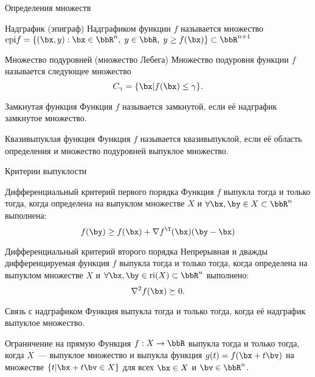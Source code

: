 \documentclass[12pt,russian]{beamer}
\begin{document}
\begin{frame}{Определения множеств}
\footnotesize
\begin{block}{Надграфик (эпиграф)}
Надграфиком функции $f$ называется множество $\text{epi}f = \{ (\bx, y) : \bx \in \bbR^n, \; y \in \bbR, \; y \geq f(\bx) \} \subset \bbR^{n+1}$
\end{block}

\begin{block}{Множество подуровней (множество Лебега)}
Множество подуровня функции $f$ называется следующее множество
\vspace{-4mm}
\[
C_{\gamma} = \{ \bx | f(\bx) \leq \gamma \}.
\]
\end{block}

\begin{block}{Замкнутая функция}
Функция $f$ называется замкнутой, если её надграфик замкнутое множество. 
\end{block}

\begin{block}{Квазивыпуклая функция}
Функция $f$ называется квазивыпуклой, если её область определения и множество подуровней выпуклое множество. 
\end{block}
\end{frame}

\begin{frame}{Критерии выпуклости}
\scriptsize
\begin{block}{Дифференциальный критерий первого порядка}
Функция $f$ выпукла тогда и только тогда, когда определена на выпуклом множестве $X$ и $\forall \bx, \by \in X \subset \bbR^n$ выполнена:
\vspace{-4mm}
\[
f(\by) \geq f(\bx) + \nabla f^{\T}(\bx)(\by - \bx)
\]
\end{block}

\begin{block}{Дифференциальный критерий второго порядка}
Непрерывная и дважды дифференцируемая функция $f$ выпукла тогда и только тогда, когда определена на выпуклом множестве $X$ и $\forall \bx, \by \in \text{ri}(X) \subset \bbR^n$ выполнено:
\vspace{-2mm}
\[
\nabla^2 f(\bx) \succeq 0.
\]
\end{block}

\begin{block}{Связь с надграфиком}
Функция выпукла тогда и только тогда, когда её надграфик выпуклое множество.
\end{block}

\begin{block}{Ограничение на прямую}
Функция $f: X \rightarrow \bbR$ выпукла тогда и только тогда, когда $X$~--- выпуклое множество и выпукла функция $g(t) = f(\bx + t\bv)$ на множестве $\{ t | \bx + t\bv \in X \}$ для всех $\bx \in X$ и $\bv \in \bbR^n$.
\end{block}

\end{frame}
\end{document}
